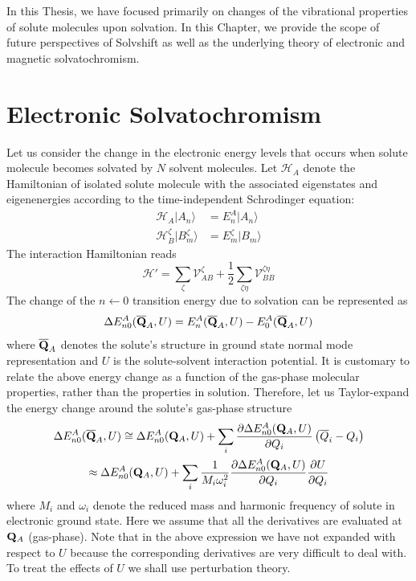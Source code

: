 \documentclass[a4paper,titlepage,twoside,fleqn,12pt]{book}
\newcommand{\fderiv}[2]{\ensuremath{
\frac{\partial #1}{\partial #2}}}
\begin{document}
In this Thesis, we have focused primarily on changes of the vibrational
properties of solute molecules upon solvation. In this Chapter, 
we provide the scope of future perspectives of {\sc Solvshift}
as well as the underlying theory of electronic and magnetic solvatochromism.

\section{Electronic Solvatochromism}

Let us consider the change in the electronic energy levels
that occurs when solute molecule becomes solvated by $N$
solvent molecules. Let $\mathscr{H}_A$ denote the Hamiltonian
of isolated solute molecule with the associated 
eigenstates and eigenenergies according to the time\hyp{}independent
Schr{\:o}dinger equation:
%
\begin{subequations}
\begin{align}
\mathscr{H}_A \vert A_n \rangle &=  E^A_n \vert A_n \rangle \\
\mathscr{H}_B^{\zeta} \vert B_m^{\zeta} \rangle &=  E^{\zeta}_m \vert B_m \rangle
\end{align}
\end{subequations}
%
The interaction Hamiltonian reads
%
\begin{equation}
\mathscr{H}' = \sum_{\zeta} \mathscr{V}_{AB}^{\zeta} + \frac{1}{2} \sum_{\zeta\eta} \mathscr{V}_{BB}^{\zeta\eta}
\end{equation}
%
The change of the $n\leftarrow 0$ transition energy
due to solvation can be represented as
%
\begin{equation}
\Delta E^A_{n0}({\bf \overline{Q}}_A, U) = E^A_n({\bf \overline{Q}}_A, U) - E^A_0({\bf \overline{Q}}_A, U)
\end{equation}
%
where ${\bf \overline{Q}}_A$ denotes the solute's structure
in ground state normal mode representation and 
$U$ is the solute\hyp{}solvent interaction potential.
It is customary to relate the above energy change as a function of the 
gas\hyp{}phase molecular properties, rather than the properties 
in solution. Therefore, let us Taylor\hyp{}expand the energy change
around the solute's gas\hyp{}phase structure
%
\begin{multline}
\Delta E^A_{n0}({\bf \overline{Q}}_A, U) \cong \Delta E^A_{n0}({\bf Q}_A, U) + 
\sum_i  \fderiv{\Delta E^A_{n0}({\bf Q}_A, U)}{Q_i} 
\left( \overline{Q}_i - Q_i \right) 
\\
 \approx \Delta E^A_{n0}({\bf Q}_A, U) + 
\sum_i \frac{1}{M_i\omega_i^2} \fderiv{\Delta E^A_{n0}({\bf Q}_A, U)}{Q_i} \fderiv{U}{Q_i}
\end{multline}
%
where $M_i$ and $\omega_i$ denote the reduced mass and harmonic
frequency of solute in electronic ground state. Here we assume that
all the derivatives are evaluated at ${\bf {Q}}_A$ (gas\hyp{}phase).
Note that in the above expression we have not expanded with respect to
$U$ because the corresponding derivatives are very difficult to deal with.
To treat the effects of $U$ we shall use perturbation theory.
\end{document}
